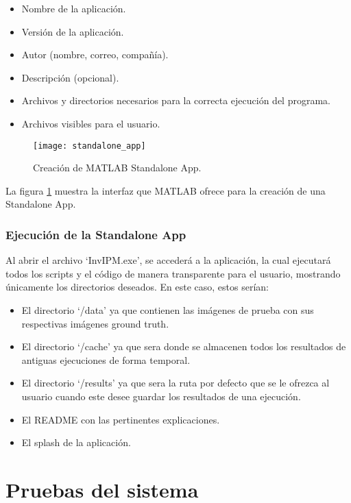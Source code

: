 \begin{itemize}
    \item Nombre de la aplicación.
    \item Versión de la aplicación.
    \item Autor (nombre, correo, compañía).
    \item Descripción (opcional).
    \item Archivos y directorios necesarios para la correcta ejecución del programa.
    \item Archivos visibles para el usuario.
\end{itemize}

\begin{figure}[h!]
  \centering
  \texttt{[image: standalone\_app]}
  \caption{Creación de MATLAB Standalone App.}
  \label{fig:standalone_app}
\end{figure}

La figura \ref{fig:standalone_app} muestra la interfaz que MATLAB ofrece para la creación de una Standalone App.

\subsubsection{Ejecución de la Standalone App}\label{ejecución-de-la-standalone-app}

Al abrir el archivo `InvIPM.exe', se accederá a la aplicación, la cual ejecutará todos los scripts y el código de manera transparente para el usuario, mostrando únicamente los directorios deseados. En este caso, estos serían:

\begin{itemize}
    \item El directorio `/data' ya que contienen las imágenes de prueba con sus respectivas imágenes ground truth.
    \item El directorio `/cache' ya que sera donde se almacenen todos los resultados de antiguas ejecuciones de forma temporal.
    \item El directorio `/results' ya que sera la ruta por defecto que se le ofrezca al usuario cuando este desee guardar los resultados de una ejecución.
    \item El README con las pertinentes explicaciones.
    \item El splash de la aplicación.
\end{itemize}

\section{Pruebas del sistema}\label{pruebas-del-sistema}

